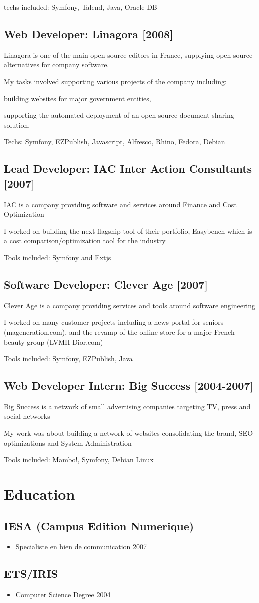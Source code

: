 \documentclass{article}
\begin{document}
techs included: Symfony, Talend, Java, Oracle DB

\subsection*{Web Developer: Linagora [2008]}
Linagora is one of the main open source editors in France, supplying
open source alternatives for company software.

My tasks involved supporting various projects of the company including:

building websites for major government entities,

supporting the automated deployment of an open source document sharing solution.

Techs: Symfony, EZPublish, Javascript, Alfresco, Rhino, Fedora, Debian

\subsection*{Lead Developer: IAC Inter Action Consultants [2007]}
IAC is a company providing software and services around Finance and Cost Optimization

I worked on building the next flagship tool of their portfolio, Easybench which is a cost comparison/optimization
tool for the industry

Tools included: Symfony and Extjs

\subsection*{Software Developer: Clever Age [2007]}
Clever Age is a company providing services and tools around software engineering

I worked on many customer projects including a news portal for seniors (mageneration.com),
and the revamp of the online store for a major French beauty group (LVMH Dior.com)

Tools included: Symfony, EZPublish, Java

\subsection*{Web Developer Intern: Big Success [2004-2007]}
Big Success is a network of small advertising companies targeting TV, press and social networks

My work was about building a network of websites consolidating the brand, SEO optimizations and System Administration

Tools included: Mambo!, Symfony, Debian Linux

\section*{Education}
\subsection*{IESA (Campus Edition Numerique)}
\begin{itemize}
\item Specialiste en bien de communication 2007
\end{itemize}
\subsection*{ETS/IRIS}
\begin{itemize}
\item Computer Science Degree 2004
\end{itemize}
\end{document}
